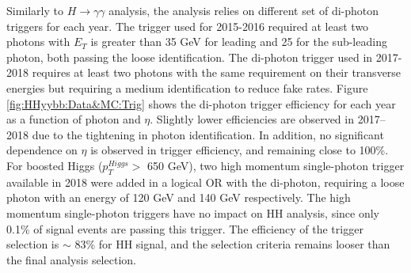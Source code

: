 Similarly to $H\rightarrow\gamma\gamma$ analysis, the \HHyybb analysis relies on different set of di-photon triggers for each year. The trigger used for 2015-2016 required at least two photons with $E_T$ is greater than 35 GeV for leading and 25 for the sub-leading photon, both passing the loose identification. The di-photon trigger used in 2017-2018 requires at least two photons with the same requirement on their transverse energies but requiring a medium identification to reduce fake rates. Figure \ref{fig:HHyybb:Data&MC:Trig} shows the di-photon trigger efficiency for each year as a function of photon \eT and $\eta$. Slightly lower efficiencies are observed in 2017–2018 due to the tightening in photon identification. In addition, no significant dependence on $\eta$ is observed in trigger efficiency, and remaining close to 100\%. For boosted Higgs ($p_T^{Higgs} > $ 650 GeV), two high momentum single-photon trigger available in 2018 were added in a logical OR with the di-photon, requiring a loose photon with an energy of 120 GeV and 140 GeV respectively. The high momentum single-photon triggers have no impact on HH analysis, since only 0.1\% of signal events are passing this trigger. The efficiency of the trigger selection is $\sim$ 83\% for HH signal, and the selection criteria remains looser than the final analysis selection. 


